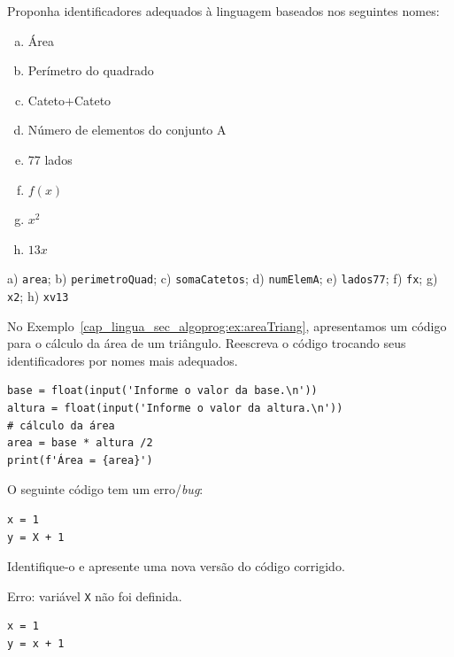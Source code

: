 \begin{exer}
  Proponha identificadores adequados à linguagem {\python} baseados nos seguintes nomes:
  \begin{enumerate}[a)]
  \item Área
  \item Perímetro do quadrado
  \item Cateto+Cateto
  \item Número de elementos do conjunto A
  \item 77 lados
  \item $f(x)$
  \item $x^2$
  \item $13x$
  \end{enumerate}
\end{exer}
\begin{resp}
  a) \texttt{area}; b) \texttt{perimetroQuad}; c) \texttt{somaCatetos}; d) \texttt{numElemA}; e) \texttt{lados77}; f) \texttt{fx}; g) \texttt{x2}; h) \texttt{xv13}
\end{resp}

\begin{exer}
  No Exemplo~\ref{cap_lingua_sec_algoprog:ex:areaTriang}, apresentamos um código {\python} para o cálculo da área de um triângulo. Reescreva o código trocando seus identificadores por nomes mais adequados.
\end{exer}
\begin{resp}

\begin{lstlisting}
base = float(input('Informe o valor da base.\n'))
altura = float(input('Informe o valor da altura.\n'))
# cálculo da área
area = base * altura /2
print(f'Área = {area}')
\end{lstlisting}

\end{resp}

\begin{exer}
  O seguinte código {\python} tem um erro/\textit{bug}:

\begin{lstlisting}
x = 1
y = X + 1
\end{lstlisting}

  Identifique-o e apresente uma nova versão do código corrigido.
\end{exer}
\begin{resp}
  Erro: variável \texttt{X} não foi definida.

\begin{lstlisting}
x = 1
y = x + 1
\end{lstlisting}

\end{resp}

